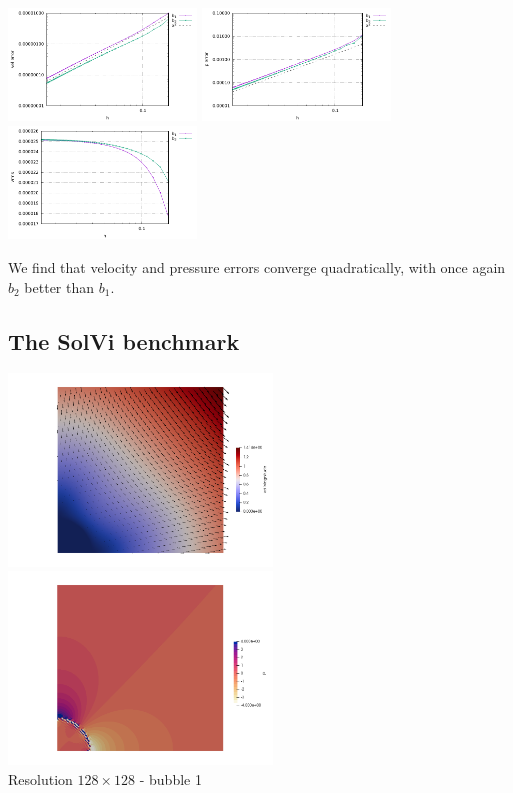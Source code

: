 \begin{center}
\includegraphics[width=5cm]{python_codes/fieldstone_72/results/solkz/errors_v}
\includegraphics[width=5cm]{python_codes/fieldstone_72/results/solkz/errors_p}
\includegraphics[width=5cm]{python_codes/fieldstone_72/results/solkz/vrms}
\end{center}

We find that velocity and pressure errors converge quadratically, with 
once again $b_2$ better than $b_1$.


\subsection*{The SolVi benchmark}


\begin{center}
\includegraphics[width=7cm]{python_codes/fieldstone_72/results/solvi/vel}
\includegraphics[width=7cm]{python_codes/fieldstone_72/results/solvi/p}\\
{\captionfont Resolution $128\times128$ - bubble 1 }
\end{center}


